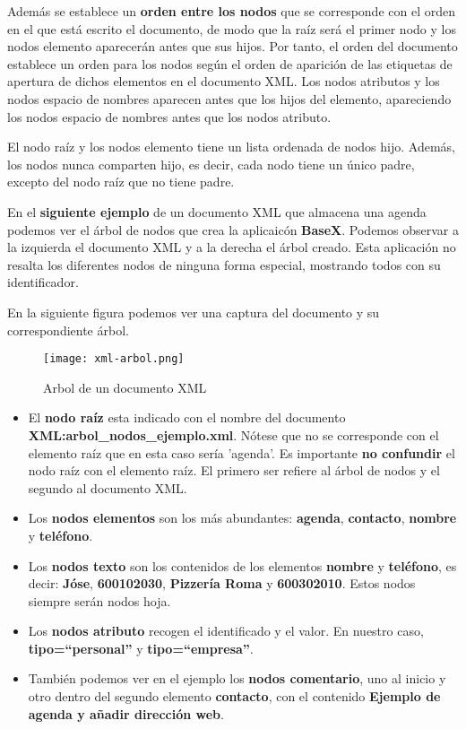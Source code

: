 Además se establece un \textbf{orden entre los nodos} que se corresponde con el orden en el que está escrito el documento, de modo que la raíz será el primer nodo y los nodos elemento aparecerán antes que sus hijos. Por tanto, el orden del documento establece un orden para los nodos según el orden de aparición de las etiquetas de apertura de dichos elementos en el documento XML. Los nodos atributos y los nodos espacio de nombres aparecen antes que los hijos del elemento, apareciendo los nodos espacio de nombres antes que los nodos atributo.

El nodo raíz y los nodos elemento tiene un lista ordenada de nodos hijo. Además, los nodos nunca comparten hijo, es decir, cada nodo tiene un único padre, excepto del nodo raíz que no tiene padre.

En el \textbf{siguiente ejemplo} de un documento XML que almacena una agenda podemos ver el árbol de nodos que crea la aplicaicón \textbf{BaseX}. Podemos observar a la izquierda el documento XML y a la derecha el árbol creado. Esta aplicación no resalta los diferentes nodos de ninguna forma especial, mostrando todos con su identificador.

En la siguiente figura podemos ver una captura del documento y su correspondiente árbol.

\begin{figure}[H]
    \centering
    \texttt{[image: xml-arbol.png]}
    \caption{Arbol de un documento XML}
\end{figure}

\begin{itemize}
    \item El \textbf{nodo raíz} esta indicado con el nombre del documento \textbf{XML:arbol\_nodos\_ejemplo.xml}. Nótese que no se corresponde con el elemento raíz que en esta caso sería 'agenda'. Es importante \textbf{no confundir} el nodo raíz con el elemento raíz. El primero ser refiere al árbol de nodos y el segundo al documento XML.

    \item Los \textbf{nodos elementos} son los más abundantes: \textbf{agenda}, \textbf{contacto}, \textbf{nombre} y \textbf{teléfono}.

    \item Los \textbf{nodos texto} son los contenidos de los elementos \textbf{nombre} y \textbf{teléfono}, es decir: \textbf{Jóse}, \textbf{600102030}, \textbf{Pizzería Roma} y \textbf{600302010}. Estos nodos siempre serán nodos hoja.

    \item Los \textbf{nodos atributo} recogen el identificado y el valor. En nuestro caso, \textbf{tipo=``personal''} y \textbf{tipo=``empresa''}.

    \item También podemos ver en el ejemplo los \textbf{nodos comentario}, uno al inicio y otro dentro del segundo elemento \textbf{contacto}, con el contenido \textbf{Ejemplo de agenda y añadir dirección web}.
\end{itemize}

